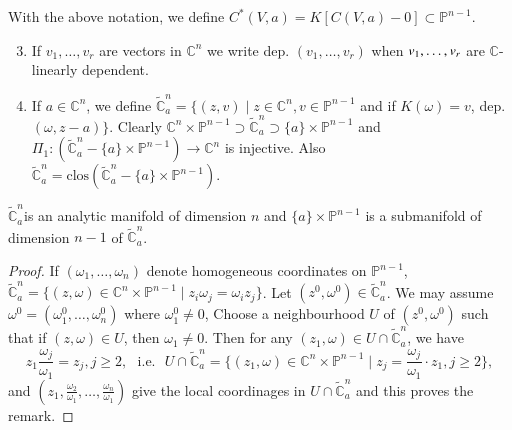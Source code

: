 \begin{definition}\label{chap3-defin2} %
With the above notation, we define $C^{\ast} (V,a) =
K[C(V,a)-0]\subset 
  \mathbb{P}^{n-1}$. 
\begin{enumerate}[(1)]
\setcounter{enumi}{2}
\item If $v_{1},\ldots,v_{r}$ are vectors in $\mathbb{C}^n$ we write
  dep. $(v_{1},\ldots,v_{r})$
  when $v_{1},\ldots,\break v_{r}$ are $\mathbb{C}$-linearly dependent. 

\item If $a \in  \mathbb{C}^n$, we define  $\tilde{\mathbb{C}}^{n}_{a}
  = \{(z, v)\mid z\in
  \mathbb{C}^n, v \in \mathbb{P}^{n-1}$ and if $K(\omega) =
  v$, dep. $(\omega,z-a)\}$. Clearly $\mathbb{C}^n \times
  \mathbb{P}^{n-1} \supset \tilde{\mathbb{C}}^{n}_{a}
  \supset \{a\} \times \mathbb{P}^{n-1}$ and $\Pi_{1}:
  (\tilde{\mathbb{C}}^{n}_{a}- \{a\} \times
  \mathbb{P}^{n-1}) \to  \mathbb{C}^n$ is injective. Also
  $\tilde{\mathbb{C}}^{n}_{a} = \text{clos}
  (\tilde{\mathbb{C}}^{n}_{a} - \{a\} \times
  \mathbb{P}^{n-1})$. 
\end{enumerate}
\end{definition} 

\begin{remark}\label{chap3-rem2} 
$\widetilde{\mathbb{C}}^{n}_{a}$\pageoriginale is an analytic manifold
  of dimension 
  $n$ and $\{a\}\times \mathbb{P}^{n-1}$ is a submanifold of dimension
  $n-1$ of $\widetilde{\mathbb{C}}^{n}_{a}$. 
\end{remark}

\begin{proof} %
 If $(\omega_{1},\ldots,\omega_{n})$ denote homogeneous coordinates on
 $\mathbb{P}^{n-1}$, $\widetilde{\mathbb{C}}^{n}_{a}=\{(z,\omega)\in
 \mathbb{C}^{n}\times\mathbb{P}^{n-1}\mid
 z_{i}\omega_{j}=\omega_{i}z_{j}\}$. Let $(z^{0},\omega^{0})\in
 \widetilde{\mathbb{C}}^{n}_{a}$. We may assume
 $\omega^{0}=(\omega^{0}_{1},\ldots,\omega^{0}_{n})$ where
 $\omega^{0}_{1}\neq 0$, Choose a neighbourhood $U$ of
 $(z^{0},\omega^{0})$ such that if $(z,\omega)\in U$, then
 $\omega_{1}\neq 0$. Then for any $(z_{1},\omega)\in U\cap
 \widetilde{\mathbb{C}}^{n}_{a}$, we have
{\fontsize{10pt}{12pt}\selectfont
$$
z_{1}\dfrac{\omega_{j}}{\omega_{1}}=z_{j}, j\geq 2, \text{~ i.e. ~}
U\cap \widetilde{\mathbb{C}}^{n}_{a}=\{(z_{1},\omega)\in
\mathbb{C}^{n}\times \mathbb{P}^{n-1}\mid
z_{j}=\dfrac{\omega_{j}}{\omega_{1}}\cdot z_{1},j\geq 2\},
$$}\relax
and
$(z_{1},\frac{\omega_{2}}{\omega_{1}},\ldots,\frac{\omega_{n}}{\omega_{1}})$
give the local coordinages in $U\cap \widetilde{\mathbb{C}}^{n}_{a}$
and this proves the remark.
\end{proof}

